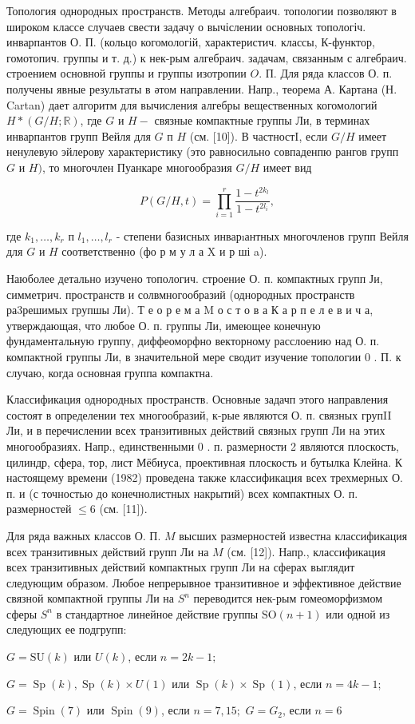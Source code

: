 \documentclass[10pt]{article}
\begin{document}
Топология однородных пространств. Методы алгебраич. топологии позволяют в широком классе случаев свести задачу о вычіслении основных топологіч. инварпантов О. П. (кольцо когомологій, характеристич. классы, К-функтор, гомотопич. группы и т. д.) к нек-рым алгебраич. задачам, связанным с алгебраич. строением основной группы и группы изотропии $O$. П. Для ряда классов О. п. получены явные результаты в әтом направлении. Напр., теорема А. Картана (Н. Cartan) дает алгоритм для вычисления алгебры вещественных когомологий $H *(G / H ; \mathbb{R})$, где $G$ и $H-$ связные компактные группы Ли, в терминах инварпантов групп Вейля для $G$ п $H$ (см. [10]). В частностI, если $G / H$ имеет ненулевую эйлерову характеристику (это равносильно совпаденпю рангов групп $G$ и $H)$, то многочлен Пуанкаре многообразия $G / H$ имеет вид



\[

P(G / H, t)=\prod_{i=1}^{r} \frac{1-t^{2 k_{l}}}{1-t^{2 l_{i}}},

\]



где $k_{1}, \ldots, k_{r}$ п $l_{1}, \ldots, l_{r}$ - степени базисных инварıантных многочленов групп Вейля для $G$ и $H$ соответственно (фо р м у л а X и р ші a).



Наюболее детально изучено топологич. строение О. п. компактных групп Ји, симметрич. пространств и солвмногообразий (однородных пространств ра3решимых групшы Ли). Т е о р е м а $\mathrm{M}$ о с т о в а К а р п е л е в и ч а, утверждающая, что любое О. п. группы Ли, имеющее конечную фундаментальную группу, диффеоморфно векторному расслоению над О. п. компактной группы Ли, в значительной мере сводит изучение топологии 0 . П. к случаю, когда основная группа компактна.



Классификация однородных пространств. Основные задачп этого направления состоят в определении тех многообразий, к-рые являются О. п. связных групII Ли, и в перечислении всех транзитивных действий связных групп Ли на этих многообразиях. Напр., единственными 0 . п. размерности 2 являются плоскость, цилиндр, сфера, тор, лист Мёбиуса, проективная плоскость и бутылка Клейна. К настоящему времени (1982) проведена также классификация всех трехмерных О. п. и (с точностью до конечнолистных накрытий) всех компактных О. п. размерностей $\leqslant 6$ (см. [11]).



Для ряда важных классов О. П. $M$ высших размерностей известна классификация всех транзитивных действий групп Ли на $M$ (см. [12]). Напр., классификация всех транзитивных действий компактных групп Ли на сферах выглядит следующим образом. Любое непрерывное транзитивное и эффективное действие связной компактной группы Ли на $S^{n}$ переводится нек-рым гомеоморфизмом сферы $S^{n}$ в стандартное линейное действие группы $\mathrm{SO}(n+1)$ или одной из следующих ее подгрупп:



$G=\mathrm{SU}(k)$ или $U(k)$, если $n=2 k-1 ;$



$G=\operatorname{Sp}(k), \operatorname{Sp}(k) \times U(1)$ или $\operatorname{Sp}(k) \times \operatorname{Sp}(1)$, если $n=4 k-1$;



$G=\operatorname{Spin}(7)$ или $\operatorname{Spin}(9)$, если $n=7,15 ;$ $G=G_{2}$, если $n=6$
\end{document}
